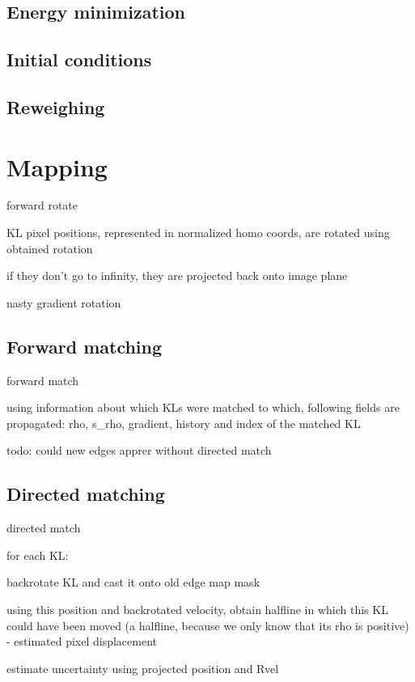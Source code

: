 \subsection{Energy minimization}

\subsection{Initial conditions}

\subsection{Reweighing}


\section{Mapping}

forward rotate

KL pixel positions, represented in normalized homo coords, are rotated using obtained rotation

if they don't go to infinity, they are projected back onto image plane

nasty gradient rotation

\subsection{Forward matching}

forward match

using information about which KLs were matched to which, following fields are propagated: rho, s\_rho, gradient, history and index of the matched KL

todo: could new edges apprer without directed match

\subsection{Directed matching}

directed match

 for each KL:

   backrotate KL and cast it onto old edge map mask

   using this position and backrotated velocity, obtain halfline in which this KL could have been moved (a halfline, because we only know that its rho is positive) - estimated pixel displacement

   estimate uncertainty using projected position and Rvel

